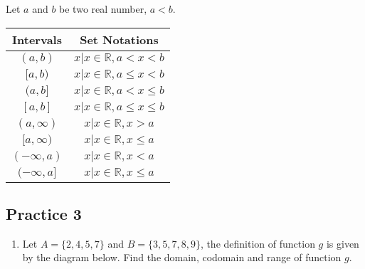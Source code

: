 \documentclass{report}
\begin{document}
\begin{multicols}{2}
\begin{mdframed}[style=MyFrame]
    \noindent Let $a$ and $b$ be two real number, $a < b$.
    \begin{center}
      \begin{tabular}{|c|c|}
        \hline
        Intervals      & Set Notations                             \\
        \hline
        $(a, b)$       & ${x | x \in \mathbb{R}, a < x < b}$       \\
        $[a, b)$       & ${x | x \in \mathbb{R}, a \leq x < b}$    \\
        $(a, b]$       & ${x | x \in \mathbb{R}, a < x \leq b}$    \\
        $[a, b]$       & ${x | x \in \mathbb{R}, a \leq x \leq b}$ \\
        $(a, \infty)$  & ${x | x \in \mathbb{R}, x > a}$           \\
        $[a, \infty)$  & ${x | x \in \mathbb{R}, x \leq a}$        \\
        $(-\infty, a)$ & ${x | x \in \mathbb{R}, x < a}$           \\
        $(-\infty, a]$ & ${x | x \in \mathbb{R}, x \leq a}$        \\
        \hline
      \end{tabular}
    \end{center}
  \end{mdframed}

  \subsection{Practice 3}

  \begin{enumerate}
    \item Let $A = \{2, 4, 5, 7\}$ and $B = \{3, 5, 7, 8, 9\}$, the definition of
          function $g$ is given by the diagram below. Find the domain, codomain and range
          of function $g$.
          \begin{center}
\end{center}
\end{enumerate}
\end{multicols}
\end{document}
